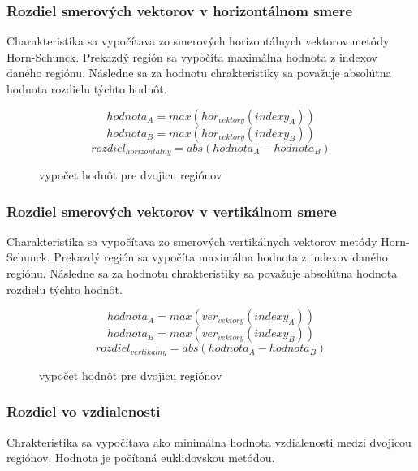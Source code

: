 \subsubsection{Rozdiel smerových vektorov v horizontálnom smere}
Charakteristika sa vypočítava zo smerových horizontálnych vektorov metódy Horn-Schunck.
Prekazdý región sa vypočíta maximálna hodnota z indexov daného regiónu.
Následne sa za hodnotu chrakteristiky sa považuje absolútna hodnota rozdielu týchto hodnôt.

\begin{figure}[H]
  \begin{equation}
    hodnota_A = max(hor_{vektory}(indexy_A))
  \end{equation}
  \begin{equation}
    hodnota_B = max(hor_{vektory}(indexy_B))
  \end{equation}
  \begin{equation}
    rozdiel_{horizontalny} = abs(hodnota_A-hodnota_B)
  \end{equation}
  \caption{vypočet hodnôt pre dvojicu regiónov}
  \vspace{10mm}
\end{figure}

\subsubsection{Rozdiel smerových vektorov v vertikálnom smere}
Charakteristika sa vypočítava zo smerových vertikálnych vektorov metódy Horn-Schunck.
Prekazdý región sa vypočíta maximálna hodnota z indexov daného regiónu.
Následne sa za hodnotu chrakteristiky sa považuje absolútna hodnota rozdielu týchto hodnôt.

\begin{figure}[H]
  \begin{equation}
    hodnota_A = max(ver_{vektory}(indexy_A))
  \end{equation}
  \begin{equation}
    hodnota_B = max(ver_{vektory}(indexy_B))
  \end{equation}
  \begin{equation}
    rozdiel_{vertikalny} = abs(hodnota_A-hodnota_B)
  \end{equation}
  \caption{vypočet hodnôt pre dvojicu regiónov}
  \vspace{10mm}
\end{figure}

\subsubsection{Rozdiel vo vzdialenosti}
Chrakteristika sa vypočítava ako minimálna hodnota vzdialenosti medzi dvojicou regiónov.
Hodnota je počítaná euklidovskou metódou.

